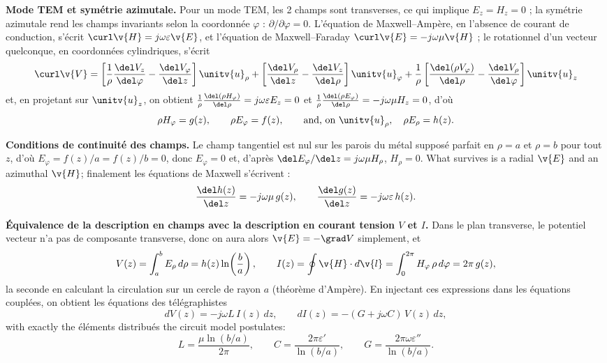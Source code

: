 \begin{example}
  \textbf{Mode TEM et symétrie azimutale.} Pour un mode TEM, les 2 champs sont
  transverses, ce qui implique $E_z = H_z = 0$ ; la symétrie azimutale rend les
  champs invariants selon la coordonnée $\varphi$ : $\partial/\partial\varphi = 0$.
  L'équation de Maxwell--Ampère, en l'absence de courant de conduction,
  s'écrit $\curl \v{H} = j\omega\varepsilon\v{E}$, et l'équation de
  Maxwell--Faraday $\curl \v{E} = -j\omega\mu\v{H}$ ; le rotationnel d'un
  vecteur quelconque, en coordonnées cylindriques, s'écrit
  \[
    \curl \v{V} =
      \left[\frac{1}{\rho}\frac{\del V_z}{\del \varphi}
            - \frac{\del V_\varphi}{\del z}\right]\unitv{u}_\rho
    + \left[\frac{\del V_\rho}{\del z}
            - \frac{\del V_z}{\del \rho}\right]\unitv{u}_\varphi
    + \frac{1}{\rho}\left[\frac{\del (\rho V_\varphi)}{\del \rho}
            - \frac{\del V_\rho}{\del \varphi}\right]\unitv{u}_z
  \]
  et, en projetant sur $\unitv{u}_z$, on obtient
  $\frac{1}{\rho}\frac{\del(\rho H_\varphi)}{\del\rho} = j\omega\varepsilon E_z = 0$
  et
  $\frac{1}{\rho}\frac{\del(\rho E_\varphi)}{\del\rho} = -j\omega\mu H_z = 0$,
  d'où
  \[
    \rho H_\varphi = g(z), \qquad \rho E_\varphi = f(z),
    \qquad \text{and, on } \unitv{u}_\rho, \quad \rho E_\rho = h(z).
  \]

  \textbf{Conditions de continuité des champs.} Le champ tangentiel est nul sur les parois
  du métal supposé parfait en $\rho = a$ et $\rho = b$ pour tout $z$, d'où
  $E_\varphi = f(z)/a = f(z)/b = 0$, donc $E_\varphi = 0$ et, d'après
  $\del E_\varphi/\del z = j\omega\mu H_\rho$, $H_\rho = 0$. What survives is a
  radial $\v{E}$ and an azimuthal $\v{H}$; finalement les équations de Maxwell
  s'écrivent :
  \[
    \frac{\del h(z)}{\del z} = -j\omega\mu\, g(z),
    \qquad
    \frac{\del g(z)}{\del z} = -j\omega\varepsilon\, h(z).
  \]

  \textbf{Équivalence de la description en champs avec la description en
  courant tension $V$ et $I$.} Dans le plan transverse, le potentiel
  vecteur n'a pas de composante transverse, donc on aura alors
  $\v{E} = -\grad V$ simplement, et
  \[
    V(z) = \int_a^b E_\rho\, d\rho = h(z)\ln\!\left(\frac{b}{a}\right),
    \qquad
    I(z) = \oint \v{H}\cdot d\v{l} = \int_0^{2\pi} H_\varphi\,\rho\, d\varphi
         = 2\pi\, g(z),
  \]
  la seconde en calculant la circulation sur un cercle de rayon $a$ (théorème
  d'Ampère). En injectant ces expressions dans les équations couplées, on
  obtient les équations des télégraphistes
  \[
    dV(z) = -j\omega L\, I(z)\, dz,
    \qquad
    dI(z) = -(G + j\omega C)\, V(z)\, dz,
  \]
  with exactly the éléments distribués the circuit model postulates:
  \[
    L = \frac{\mu\ln(b/a)}{2\pi},
    \qquad
    C = \frac{2\pi\varepsilon'}{\ln(b/a)},
    \qquad
    G = \frac{2\pi\omega\varepsilon''}{\ln(b/a)} .
  \]
\end{example}

